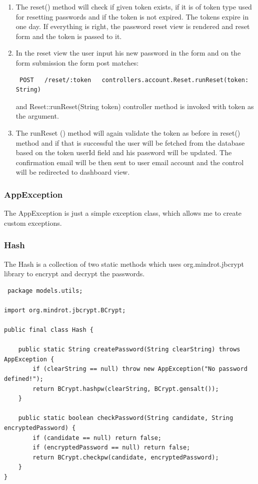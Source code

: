 \documentclass[12pt,twoside,a4paper]{report}
\begin{document}
\begin{enumerate}
\item The reset() method will check if given token exists, if it is of token type used for resetting passwords and if the token is not expired. The tokens expire in one day. If everything is right, the password reset view is rendered and reset form and the token is passed to it.

\item In the reset view the user input his new password in the form and on the form submission the form post matches:
\begin{lstlisting}
 POST   /reset/:token   controllers.account.Reset.runReset(token: String)
\end{lstlisting}
and Reset::runReset(String token) controller method is invoked with token as the argument.

\item The runReset () method will again validate the token as before in reset() method and if that is successful the user will be fetched from the database based on the token userId field and his password will be updated. The confirmation email will be then sent to user email account and the control will be redirected to dashboard view.
\end{enumerate}

\subsubsection{AppException}
The AppException is just a simple exception class, which allows me to create custom exceptions.

\subsubsection{Hash}
The Hash is a collection of two static methods which uses org.mindrot.jbcrypt\cite{35} library to encrypt and decrypt the passwords.

\begin{lstlisting}
 package models.utils;

import org.mindrot.jbcrypt.BCrypt;

public final class Hash {

    public static String createPassword(String clearString) throws AppException {
        if (clearString == null) throw new AppException("No password defined!");
        return BCrypt.hashpw(clearString, BCrypt.gensalt());
    }

    public static boolean checkPassword(String candidate, String encryptedPassword) {
        if (candidate == null) return false;
        if (encryptedPassword == null) return false;
        return BCrypt.checkpw(candidate, encryptedPassword);
    }
}
\end{lstlisting}
\end{document}
